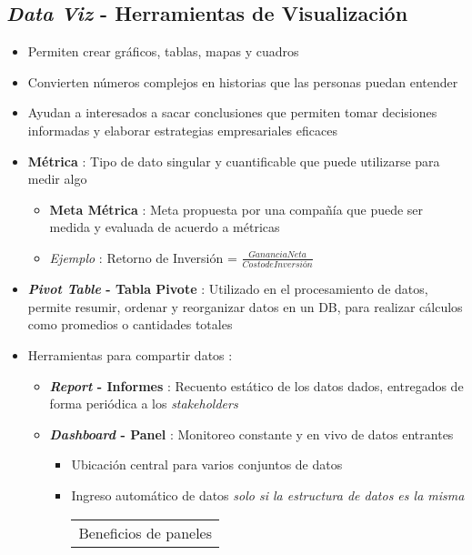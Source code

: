 \subsection{\textit{Data Viz} - Herramientas de Visualización}
\begin{itemize}
    \item {Permiten crear gráficos, tablas, mapas y cuadros}
    \item {Convierten números complejos en historias que las personas puedan entender}
    \item {Ayudan a interesados a sacar conclusiones que permiten tomar decisiones informadas y elaborar estrategias empresariales eficaces}
    \item {\textbf{Métrica} : Tipo de dato singular y cuantificable que puede utilizarse para medir algo
    \begin{itemize}
        \item {\textbf{Meta Métrica} : Meta propuesta por una compañía que puede ser medida y evaluada de acuerdo a métricas}
        \item {\textit{Ejemplo} : Retorno de Inversión = \(\frac{Ganancia Neta}{Costo de Inversión}\)}
    \end{itemize}}
    \item {\textbf{\textit{Pivot Table} - Tabla Pivote} : Utilizado en el procesamiento de datos, permite resumir, ordenar y reorganizar datos en un DB, para realizar cálculos como promedios o cantidades totales}
    \item {Herramientas para compartir datos : 
    \begin{itemize}
        \item {\textbf{\textit{Report} - Informes} : Recuento estático de los datos dados, entregados de forma periódica a los \textit{stakeholders}}
        \item {\textbf{\textit{Dashboard} - Panel} : Monitoreo constante y en vivo de datos entrantes
        \begin{itemize}
            \item {Ubicación central para varios conjuntos de datos}
            \item {Ingreso automático de datos \textit{solo si la estructura de datos es la misma}}
            \begin{table}
        \centering
        \begin{tabular}{|p{2.5cm}|p{6.5cm}|p{6.5cm}|}
            \hline
            \multicolumn{3}{|c|}{Beneficios de paneles} \\

\end{tabular}
\end{table}
\end{itemize}}
\end{itemize}}
\end{itemize}
